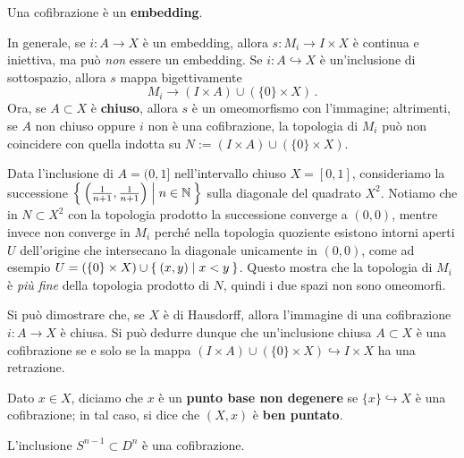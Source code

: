 \begin{prop}
	Una cofibrazione è un \textbf{embedding}.
\end{prop}

\begin{oss}
	In generale, se $i:A \to X$ è un embedding,
	allora $s:M_{i} \to I \times X$ è continua e iniettiva,
	ma può \emph{non} essere un embedding.
	Se $i:A \hookrightarrow X$ è un'inclusione di sottospazio,
	allora $s$ mappa bigettivamente
	\begin{equation*}
		M_{i} \longrightarrow (I \times A) \cup (\{0\} \times X)\,.
	\end{equation*}
	Ora, se $A \subset X$ è \textbf{chiuso}, allora $s$ è un omeomorfismo
	con l'immagine; altrimenti, se $A$ non chiuso oppure $i$ non è una
	cofibrazione, la topologia di $M_{i}$ può non coincidere con quella
	indotta su $N:=(I \times A) \cup (\{0\} \times X)$.
\end{oss}

\begin{ex}
	Data l'inclusione di $A=(0,1]$ 
	nell'intervallo chiuso $X=[0,1]$,
	consideriamo la successione 
	$\Set{\left(\frac{1}{n+1}, \frac{1}{n+1} \right)|n \in {\mathbb N}}$
	sulla diagonale del quadrato $X^{2}$.
	Notiamo che in $N \subset X^{2}$ con la topologia prodotto
	la successione converge a $(0,0)$, mentre invece non converge
	in $M_{i}$ perché nella topologia quoziente
	esistono intorni aperti $U$ dell'origine che
	intersecano la diagonale unicamente in $(0,0)$, come
	ad esempio $U = \left( \{0\} \times X \right) \cup \Set{(x,y) | x<y }$.
	Questo mostra che la topologia di $M_{i}$ è \emph{più fine} 
	della topologia prodotto di $N$, quindi i due spazi non sono omeomorfi.
\end{ex}

Si può dimostrare che, se $X$ è di Hausdorff,
allora l'immagine di una cofibrazione $i:A \to X$ è chiusa.
Si può dedurre dunque che un'inclusione chiusa $A \subset X$
è una cofibrazione se e solo se la mappa 
$(I \times A) \cup (\{0\} \times X) \hookrightarrow I \times X$
ha una retrazione.

\begin{df}
	Dato $x \in X$, diciamo che $x$ è un \textbf{punto base non degenere}
	se $\{x\} \hookrightarrow X$ è una cofibrazione; in tal caso,
	si dice che $(X,x)$ è \textbf{ben puntato}.
\end{df}

\begin{ex}
	L'inclusione $S^{n-1} \subset D^{n}$ è una cofibrazione.
\end{ex}

